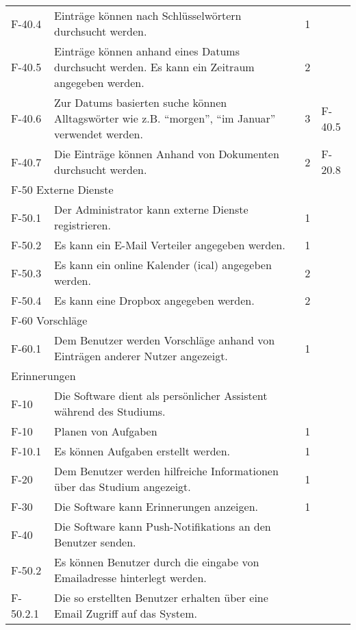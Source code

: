 \begin{tabularx}{\textwidth}{|l|X|l|l|}
    F-40.4 & Einträge können nach Schlüsselwörtern durchsucht werden. & 1 & \\
    F-40.5 & Einträge können anhand eines Datums durchsucht werden. Es kann ein Zeitraum angegeben werden. & 2 & \\
    F-40.6 & Zur Datums basierten suche können Alltagswörter wie z.B. \enquote{morgen}, \enquote{im Januar} verwendet werden. & 3 & F-40.5\\
    F-40.7 & Die Einträge können Anhand von Dokumenten durchsucht werden. & 2 & F-20.8\\
    \hline
    \multicolumn{4}{|l|}{F-50 Externe Dienste}\\
    F-50.1 & Der Administrator kann externe Dienste registrieren. & 1 & \\
    F-50.2 & Es kann ein E-Mail Verteiler angegeben werden. & 1 & \\
    F-50.3 & Es kann ein online Kalender (ical) angegeben werden. & 2 & \\
    F-50.4 & Es kann eine Dropbox angegeben werden. & 2 & \\

    \hline
    \multicolumn{4}{|l|}{F-60 Vorschläge}\\
    \hline 
    F-60.1 & Dem Benutzer werden Vorschläge anhand von Einträgen anderer Nutzer angezeigt. & 1 & \\

    \hline
    \multicolumn{4}{|l|}{Erinnerungen}\\
    \hline

    F-10 & Die Software dient als persönlicher Assistent während des Studiums. & & \\
    F-10 & Planen von Aufgaben & 1 & \\
    F-10.1 & Es können Aufgaben erstellt werden. & 1 & \\

    F-20 & Dem Benutzer werden hilfreiche Informationen über das Studium angezeigt. & 1 & \\

    F-30 & Die Software kann Erinnerungen anzeigen. & 1 & \\

    F-40 & Die Software kann Push-Notifikations an den Benutzer senden. & & \\

    F-50.2 & Es können Benutzer durch die eingabe von Emailadresse hinterlegt werden. & & \\
    F-50.2.1 & Die so erstellten Benutzer erhalten über eine Email Zugriff auf das System. & & \\ %
    

\end{tabularx}

